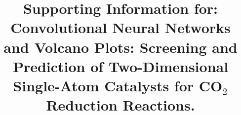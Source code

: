 


\title{Supporting Information for:  \\
Convolutional Neural Networks and Volcano Plots: Screening and Prediction of
Two-Dimensional Single-Atom Catalysts for CO$_2$ Reduction Reactions.}

\maketitle
